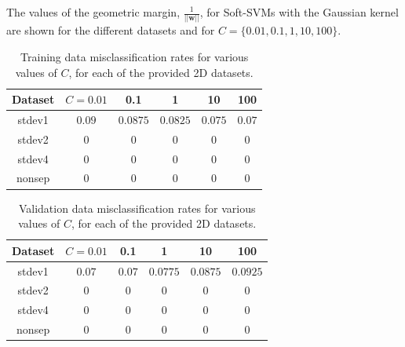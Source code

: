 \documentclass[10pt]{article}
\begin{document}
The values of the geometric margin, $\frac{1}{||\mathbf{w}||}$, for Soft-SVMs with the Gaussian kernel are shown for the different datasets and for $C = \{ 0.01, 0.1, 1, 10, 100 \}$.

 
  \begin{table}[H]
 \begin{tabular}{|c|c|c|c|c|c|}
 \hline
Dataset & $C = 0.01$ & 0.1 & 1 & 10 & 100  \\ \hline
stdev1 & $0.09$ & $0.0875$ & $0.0825$ & $0.075$ & $0.07$ \\ \hline
stdev2 & $0$ & $0$ & $0$ & $0$ & $0$ \\ \hline
stdev4 & $0$ & $0$ & $0$ & $0$ & $0$ \\ \hline
nonsep & $0$ & $0$ & $0$ & $0$ & $0$ \\ \hline
  \end{tabular}
 \caption{Training data misclassification rates for various values of $C$, for each of the provided 2D datasets.}
 \label{weights}
 \end{table}

  \begin{table}[H]
 \begin{tabular}{|c|c|c|c|c|c|}
 \hline
Dataset & $C = 0.01$ & 0.1 & 1 & 10 & 100  \\ \hline
stdev1 & $0.07$ & $0.07$ & $0.0775$ & $0.0875$ & $0.0925$ \\ \hline
stdev2 & $0$ & $0$ & $0$ & $0$ & $0$ \\ \hline
stdev4 & $0$ & $0$ & $0$ & $0$ & $0$ \\ \hline
nonsep & $0$ & $0$ & $0$ & $0$ & $0$ \\ \hline
  \end{tabular}
 \caption{Validation data misclassification rates for various values of $C$, for each of the provided 2D datasets.}
 \label{weights}
 \end{table}
\end{document}
